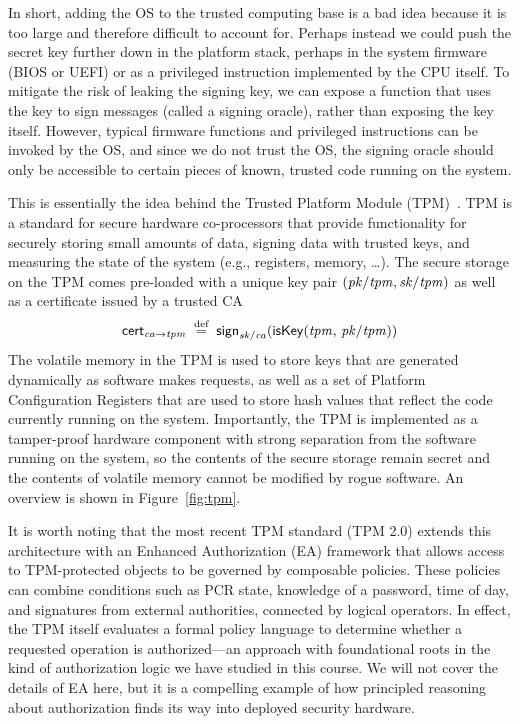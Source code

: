 \documentclass[11pt]{article}
\newcommand{\pk}[1]{\ensuremath{\mi{pk/#1}}}
\newcommand{\sk}[1]{\ensuremath{\mi{sk/#1}}}
\newcommand{\sign}[1]{\ms{sign}_{#1}}
\newcommand{\cert}[2]{\ms{cert}_{{#1} \arrow {#2}}}
\newcommand{\iskey}[2]{\ms{isKey}(#1,\, #2)}
\begin{document}
In short, adding the OS to the trusted computing base is a bad idea because it is too large and therefore difficult to account for. Perhaps instead we could push the secret key further down in the platform stack, perhaps in the system firmware (BIOS or UEFI) or as a privileged instruction implemented by the CPU itself. To mitigate the risk of leaking the signing key, we can expose a function that uses the key to sign messages (called a signing oracle), rather than exposing the key itself. However, typical firmware functions and privileged instructions can be invoked by the OS, and since we do not trust the OS, the signing oracle should only be accessible to certain pieces of known, trusted code running on the system.

This is essentially the idea behind the Trusted Platform Module (TPM)~\cite{TPM2Spec,ArthurTPM2}. TPM is a standard for secure hardware co-processors that provide functionality for securely storing small amounts of data, signing data with trusted keys, and measuring the state of the system (e.g., registers, memory, \ldots). The secure storage on the TPM comes pre-loaded with a unique key pair $(\pk{tpm}, \sk{tpm})$ as well as a certificate issued by a trusted CA
\[
  \cert{\mi{ca}}{\mi{tpm}}
    \;\stackrel{\text{def}}{=}\;
    \sign{\sk{ca}}(\iskey{\mi{tpm}}{\pk{tpm}})
\]
The volatile memory in the TPM is used to store keys that are generated dynamically as software makes requests, as well as a set of Platform Configuration Registers that are used to store hash values that reflect the code currently running on the system. Importantly, the TPM is implemented as a tamper-proof hardware component with strong separation from the software running on the system, so the contents of the secure storage remain secret and the contents of volatile memory cannot be modified by rogue software. An overview is shown in Figure~\ref{fig:tpm}.

It is worth noting that the most recent TPM standard (TPM 2.0) extends this architecture with an Enhanced Authorization (EA) framework that allows access to TPM-protected objects to be governed by composable policies. These policies can combine conditions such as PCR state, knowledge of a password, time of day, and signatures from external authorities, connected by logical operators. In effect, the TPM itself evaluates a formal policy language to determine whether a requested operation is authorized---an approach with foundational roots in the kind of authorization logic we have studied in this course. We will not cover the details of EA here, but it is a compelling example of how principled reasoning about authorization finds its way into deployed security hardware.
\end{document}

